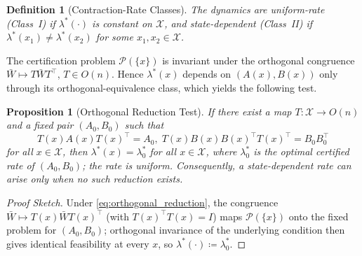 \documentclass[lettersize,journal]{IEEEtran}
\newtheorem{definition}{Definition}
\newtheorem{proposition}{Proposition}
\begin{document}
\begin{definition}[Contraction-Rate Classes]\label{def:classes}
The dynamics are \emph{uniform-rate} (Class~I) if $\lambda^*(\cdot)$ is constant
on $\mathcal{X}$, and \emph{state-dependent} (Class~II) if
$\lambda^*(x_1)\neq\lambda^*(x_2)$ for some $x_1,x_2\in\mathcal{X}$.
\end{definition}

The certification problem $\mathcal{P}(\{x\})$ is invariant under the orthogonal
congruence $\bar W\mapsto T\bar W T^\top$, $T\in O(n)$. Hence $\lambda^*(x)$
depends on $(A(x),B(x))$ only through its orthogonal-equivalence class, which
yields the following test.

\begin{proposition}[Orthogonal Reduction Test]\label{prop:orthogonal_test}
If there exist a map $T:\mathcal{X}\rightarrow O(n)$ and a fixed pair
$(A_0,B_0)$ such that
\begin{equation}\label{eq:orthogonal_reduction}
    T(x)A(x)T(x)^\top=A_0, \; T(x)B(x)B(x)^\top T(x)^\top = B_0B_0^\top
\end{equation}
for all $x\in\mathcal{X}$, then $\lambda^*(x)=\lambda_0^*$ for all $x\in\mathcal{X}$, where $\lambda_0^*$ is the optimal certified rate of $(A_0,B_0)$; the rate is uniform. 
Consequently, a state-dependent rate can arise only when no such reduction exists.
\end{proposition}


\begin{proof}[Proof Sketch]
Under \eqref{eq:orthogonal_reduction}, the congruence $\bar W\mapsto T(x)\bar W T(x)^\top$ (with $T(x)^\top T(x)=I$) maps $\mathcal{P}(\{x\})$ onto the fixed problem for $(A_0,B_0)$; orthogonal invariance of the underlying condition then gives identical feasibility at every $x$, so $\lambda^*(\cdot)\coloneq \lambda_0^*$.
\end{proof}
\end{document}
